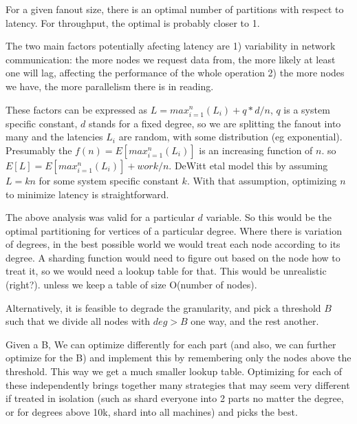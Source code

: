 \documentclass[11pt]{article}
\begin{document}

For a given fanout size, there is an optimal number of partitions with respect to latency. For throughput, the optimal is probably  closer to 1.

The two main factors potentially afecting latency are 1) variability in network communication: the more nodes we request data from, the more likely
at least one will lag, affecting the performance of the whole operation 2) the more nodes we have, the more parallelism there is in reading.

These factors can be expressed as \(L = max_{i=1}^n(L_i) + q*d/n\), \(q\) is a system specific constant, \(d\) stands for a fixed degree, so we are splitting the fanout into many and the latencies \(L_i\) are random, with some distribution (eg exponential). Presumably the \(f(n) = E[max_{i=1}^n(L_i)]\)  is an increasing function of \(n\). so \(E[L]  = E[max_{i=1}^n(L_i)] + work/n\). DeWitt etal  model this by  assuming \(L = kn\) for some system specific constant \(k\).  With that assumption, optimizing \(n\) to minimize latency is straightforward.

The above analysis was valid for a particular \(d\) variable. So this would be the optimal partitioning for vertices of a particular degree.  Where there is variation of degrees, in the best possible world we would treat each node according to its degree. A sharding function would need to figure out based on the node how to treat it, so we would need a lookup table for that. This would be unrealistic (right?). unless we keep a table of size O(number of nodes).

Alternatively, it is feasible to degrade the granularity, and pick a threshold \(B\) such that we  divide all nodes with \(deg > B\) one way, and the rest another.

Given a B, We can optimize differently for each part (and also, we can further optimize for the B) and implement this by remembering only the nodes above the threshold. This way we get a much smaller lookup table.  Optimizing for each of these independently brings together many strategies that may seem very different if treated in isolation (such as shard everyone into 2 parts no matter the degree,  or  for degrees above 10k,  shard into all machines) and picks the best.
\end{document}
